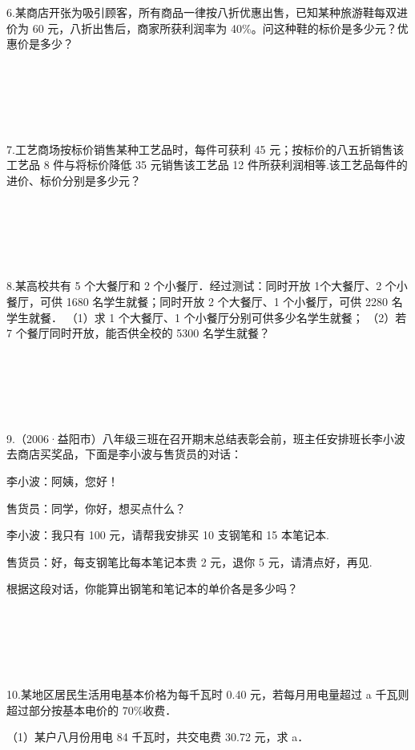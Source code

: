 \documentclass{article}
\begin{document}
~\\
~\\
~\\
~\\
~\\
6.某商店开张为吸引顾客，所有商品一律按八折优惠出售，已知某种旅游鞋每双进价为 60 元，八折出售后，商家所获利润率为 40\%。问这种鞋的标价是多少元？优惠价是多少？

~\\
~\\
~\\
~\\
~\\
7.工艺商场按标价销售某种工艺品时，每件可获利 45 元；按标价的八五折销售该工艺品 8 件与将标价降低 35 元销售该工艺品 12 件所获利润相等.该工艺品每件的进价、标价分别是多少元？

~\\
~\\
~\\
~\\
~\\
8.某高校共有 5 个大餐厅和 2 个小餐厅．经过测试：同时开放 1个大餐厅、2 个小餐厅，可供 1680 名学生就餐；同时开放 2 个大餐厅、1 个小餐厅，可供 2280 名学生就餐．
（1）求 1 个大餐厅、1 个小餐厅分别可供多少名学生就餐；
（2）若 7 个餐厅同时开放，能否供全校的 5300 名学生就餐？

~\\
~\\
~\\
~\\
~\\
9.（2006·益阳市）八年级三班在召开期末总结表彰会前，班主任安排班长李小波去商店买奖品，下面是李小波与售货员的对话：

李小波：阿姨，您好！

售货员：同学，你好，想买点什么？

李小波：我只有 100 元，请帮我安排买 10 支钢笔和 15 本笔记本. 

售货员：好，每支钢笔比每本笔记本贵 2 元，退你 5 元，请清点好，再见. 

根据这段对话，你能算出钢笔和笔记本的单价各是多少吗？

~\\
~\\
~\\
~\\
~\\
10.某地区居民生活用电基本价格为每千瓦时 0.40 元，若每月用电量超过 a 千瓦则超过部分按基本电价的 70\%收费．

（1）某户八月份用电 84 千瓦时，共交电费 30.72 元，求 a．
\end{document}
